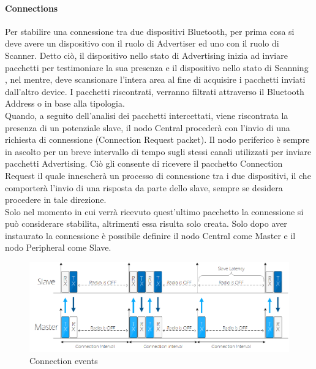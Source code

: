 \paragraph{Connections}
Per stabilire una connessione tra due dispositivi Bluetooth, per prima cosa si deve avere un dispositivo con il ruolo di Advertiser ed uno con il ruolo di Scanner. Detto ciò, il dispositivo nello stato di Advertising inizia ad inviare pacchetti per testimoniare la sua presenza e il dispositivo nello stato di Scanning , nel mentre, deve scansionare l'intera area al fine di acquisire i pacchetti inviati dall'altro device. I pacchetti riscontrati, verranno filtrati attraverso il Bluetooth Address o in base alla tipologia. \\
Quando, a seguito dell'analisi dei pacchetti intercettati, viene riscontrata la presenza di un potenziale slave, il nodo Central procederà con l'invio di una richiesta di connessione (Connection Request packet). Il nodo periferico è sempre in ascolto per un breve intervallo di tempo sugli stessi canali utilizzati per inviare pacchetti Advertising. Ciò gli consente di ricevere il pacchetto Connection Request il quale innescherà un processo di connessione tra i due dispositivi, il che comporterà l'invio di una risposta da parte dello slave, sempre se desidera procedere in tale direzione.\\
Solo nel momento in cui verrà ricevuto quest'ultimo pacchetto la connessione si può considerare stabilita, altrimenti essa risulta solo creata. Solo dopo aver instaurato la connessione è possibile definire il nodo Central come Master e il nodo Peripheral come Slave.\\

\begin{figure}[!ht]
    \centering
    \includegraphics[width = \textwidth]{images/Connection events.png}
    \caption{Connection events}
    \label{fig:connection_events}
\end{figure}


